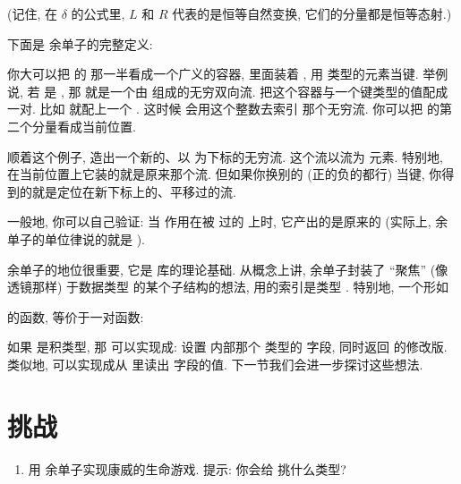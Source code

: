 (记住, 在 $\delta$ 的公式里, $L$ 和 $R$ 代表的是恒等自然变换, 它们的分量都是恒等态射.)

下面是  余单子的完整定义:

你大可以把  的  那一半看成一个广义的容器, 里面装着 ,
用  类型的元素当键. 举例说, 若  是 , 那 
就是一个由  组成的无穷双向流.  把这个容器与一个键类型的值配成一对.
比如  就配上一个 . 这时候  会用这个整数去索引
那个无穷流. 你可以把  的第二个分量看成当前位置.

顺着这个例子,  造出一个新的、以  为下标的无穷流. 这个流以流为
元素. 特别地, 在当前位置上它装的就是原来那个流. 但如果你换别的  (正的负的都行)
当键, 你得到的就是定位在新下标上的、平移过的流.

一般地, 你可以自己验证: 当  作用在被  过的 
上时, 它产出的是原来的  (实际上, 余单子的单位律说的就是
).

 余单子的地位很重要, 它是  库的理论基础. 从概念上讲,
 余单子封装了 ``聚焦'' (像透镜那样) 于数据类型  的某个子结构的想法,
用的索引是类型 . 特别地, 一个形如

的函数, 等价于一对函数:

如果  是积类型, 那  可以实现成: 设置  内部那个  类型的
字段, 同时返回  的修改版. 类似地,  可以实现成从  里读出
 字段的值. 下一节我们会进一步探讨这些想法.

\section{挑战}

\begin{enumerate}
  \tightlist
  \item
        用  余单子实现康威的生命游戏. 提示: 你会给  挑什么类型?
\end{enumerate}
